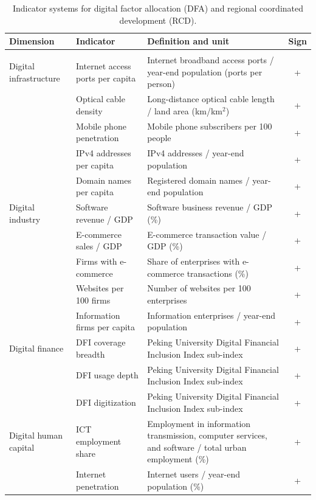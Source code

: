 \begin{table}[htbp]
\caption{Indicator systems for digital factor allocation (DFA) and regional coordinated development (RCD).}\label{tab:indicators}
\footnotesize
\begin{tabular}{>{\raggedright\arraybackslash}p{3.0cm}>{\raggedright\arraybackslash}p{4.2cm}>{\raggedright\arraybackslash}p{5.0cm}c}
\toprule
Dimension & Indicator & Definition and unit & Sign \\
\midrule
\multicolumn{4}{l}{\textit{Panel A: Digital factor allocation (DFA)}} \\
\midrule
Digital infrastructure & Internet access ports per capita & Internet broadband access ports / year-end population (ports per person) & + \\
 & Optical cable density & Long-distance optical cable length / land area (km/km$^2$) & + \\
 & Mobile phone penetration & Mobile phone subscribers per 100 people & + \\
 & IPv4 addresses per capita & IPv4 addresses / year-end population & + \\
 & Domain names per capita & Registered domain names / year-end population & + \\
Digital industry & Software revenue / GDP & Software business revenue / GDP (\%) & + \\
 & E-commerce sales / GDP & E-commerce transaction value / GDP (\%) & + \\
 & Firms with e-commerce & Share of enterprises with e-commerce transactions (\%) & + \\
 & Websites per 100 firms & Number of websites per 100 enterprises & + \\
 & Information firms per capita & Information enterprises / year-end population & + \\
Digital finance & DFI coverage breadth & Peking University Digital Financial Inclusion Index sub-index & + \\
 & DFI usage depth & Peking University Digital Financial Inclusion Index sub-index & + \\
 & DFI digitization & Peking University Digital Financial Inclusion Index sub-index & + \\
Digital human capital & ICT employment share & Employment in information transmission, computer services, and software / total urban employment (\%) & + \\
 & Internet penetration & Internet users / year-end population (\%) & + \\

\end{tabular}
\end{table}
